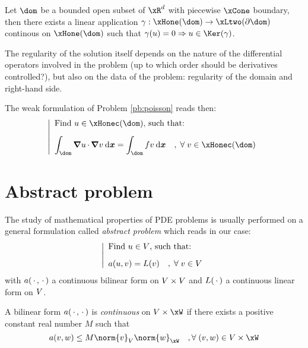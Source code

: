 \begin{lmm}
Let $\dom$ be a bounded open subset of $\xR^d$ with piecewise $\xCone$ boundary, then there exists a linear application $\gamma : \xHone(\dom) \fromto \xLtwo(\partial\dom)$ continous on $\xHone(\dom)$ such that $\gamma(u) = 0 \Rightarrow u \in \Ker(\gamma)$.
\end{lmm}

The regularity of the solution itself depends on the nature of the differential operators involved in the problem (\eg up to which order should be derivatives controlled?), but also on the data of the problem: regularity of the domain and right-hand side.

\medskip
The weak formulation of Problem \eqref{pb:poisson} reads then:
\begin{equation}\label{pb:weak_poissonHone}
\left\lvert
\begin{array}{ll}
\mbox{Find $u \in \xHonec(\dom)$, such that:}\\[2ex]
\displaystyle\int_\dom \Grad u\xDot \Grad v\dx = \int_\dom f v  \dx\quad,\;\forany  v\in \xHonec(\dom)
\end{array}
\right .
\end{equation}

\section{Abstract problem}

The study of mathematical properties of PDE problems is usually performed on a general formulation called \textit{abstract problem} which reads in our case:
\begin{equation}\label{pb:abstract}
\left\lvert
\begin{array}{ll}
\mbox{Find $u \in {V}$, such that:}\\[2ex]
\displaystyle a( u, v ) = L(v)\quad,\;{\forall\;}  v\in {V}
\end{array}
\right .
\end{equation}
with $a(\,{\mathbf\cdot}\,,\,{\mathbf\cdot}\,)$ a continuous bilinear form on ${V}\times{V}$ and $L(\,{\mathbf\cdot}\,)$ a continuous linear form on ${V}$.

\begin{prpstn}[Continuity]
A bilinear form $a(\,{\mathbf\cdot}\,,\,{\mathbf\cdot}\,)$ is \textit{continuous} on $\xV\times\xW$ if there exists a positive constant real number $M$ such that
\begin{equation*}
a( v, w ) \leq M \norm{v}_\xV \norm{w}_\xW\quad,\forany (v,w)\in \xV\times\xW
\end{equation*}
\end{prpstn}

